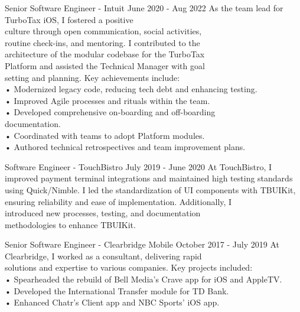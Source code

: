 \documentclass[
	10pt, %
]{FreemanCV}
\begin{document}
\begin{paracol}{2}
\jobentry
	{Senior Software Engineer - Intuit}
	{June 2020 - Aug 2022}
	{As the team lead for TurboTax iOS, I fostered a positive \\culture through open communication, social activities, \\routine check-ins, and mentoring. I contributed to the \\architecture of the modular codebase for the TurboTax \\Platform and assisted the Technical Manager with goal \\setting and planning. Key achievements include:\medskip\\
    • Modernized legacy code, reducing tech debt and enhancing testing.\\
    • Improved Agile processes and rituals within the team.\\
    • Developed comprehensive on-boarding and off-boarding \\documentation.\\
    • Coordinated with teams to adopt Platform modules.\\
    • Authored technical retrospectives and team improvement plans.}


\jobentry
	{Software Engineer - TouchBistro}
    {July 2019 - June 2020}
    {At TouchBistro, I improved payment terminal integrations and maintained high testing standards using Quick/Nimble. I led the standardization of UI components with TBUIKit, ensuring reliability and ease of implementation. Additionally, I \\introduced new processes, testing, and documentation \\methodologies to enhance TBUIKit.}


\jobentry
    {Senior Software Engineer - Clearbridge Mobile}
    {October 2017 - July 2019}
    {At Clearbridge, I worked as a consultant, delivering rapid \\solutions and expertise to various companies. Key projects included:\medskip\\
    • Spearheaded the rebuild of Bell Media’s Crave app for iOS and AppleTV.\\
    • Developed the International Transfer module for TD Bank.\\
    • Enhanced Chatr’s Client app and NBC Sports’ iOS app.}



\end{paracol}
\end{document}
